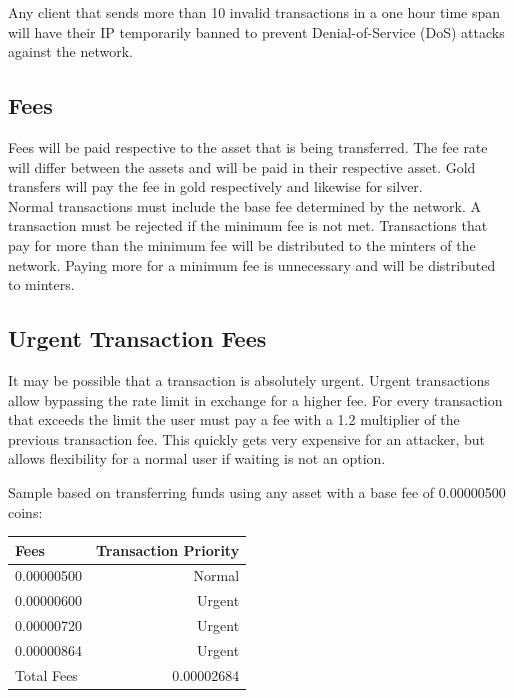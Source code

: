 \documentclass[12pt,a4paper]{article}
\begin{document}
  Any client that sends more than 10 invalid transactions in a one hour time
  span will have their IP temporarily banned to prevent \gls{Denial-of-Service}
  (DoS) attacks against the network.

  \subsection{Fees}
  Fees will be paid respective to the asset that is being transferred. The fee
  rate will differ between the assets and will be paid in their respective
  asset. Gold transfers will pay the fee in gold respectively and likewise for
  silver.\\

  Normal transactions must include the base fee determined by the network. A
  transaction must be rejected if the minimum fee is not met. Transactions that
  pay for more than the minimum fee will be distributed to the minters of the
  network. Paying more for a minimum fee is unnecessary and will be distributed
  to minters.

  \subsection{Urgent Transaction Fees}
  It may be possible that a transaction is absolutely urgent. Urgent
  transactions allow bypassing the rate limit in exchange for a higher fee. For
  every transaction that exceeds the limit the user must pay a fee with a 1.2
  multiplier of the previous transaction fee. This quickly gets very expensive
  for an attacker, but allows flexibility for a normal user if waiting is not an
  option.

  \vspace{3mm}
  Sample based on transferring funds using any asset with a base fee of
  0.00000500 coins:

  \vspace{3mm}
  \begin{tabular}{@{}lr@{}}
    Fees & Transaction Priority \\ \toprule
    0.00000500 & Normal    \\
    0.00000600 & Urgent    \\
    0.00000720 & Urgent    \\
    0.00000864 & Urgent    \\ \midrule{}
    Total Fees & 0.00002684 \\
    \bottomrule
  \end{tabular}
\end{document}
